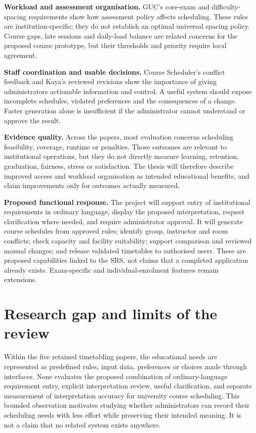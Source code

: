 \documentclass[
  11pt,a4paper,oneside]{report}
\begin{document}
\textbf{Workload and assessment organisation.} GUC's core-exam and difficulty-spacing requirements show how assessment policy affects scheduling. These rules are institution-specific; they do not establish an optimal universal spacing policy. Course gaps, late sessions and daily-load balance are related concerns for the proposed course prototype, but their thresholds and priority require local agreement.

\textbf{Staff coordination and usable decisions.} Course Scheduler's conflict feedback and Kaya's reviewed revisions show the importance of giving administrators actionable information and control. A useful system should expose incomplete schedules, violated preferences and the consequences of a change. Faster generation alone is insufficient if the administrator cannot understand or approve the result.

\textbf{Evidence quality.} Across the papers, most evaluation concerns scheduling feasibility, coverage, runtime or penalties. Those outcomes are relevant to institutional operations, but they do not directly measure learning, retention, graduation, fairness, stress or satisfaction. The thesis will therefore describe improved access and workload organisation as intended educational benefits, and claim improvements only for outcomes actually measured.

\textbf{Proposed functional response.} The project will support entry of institutional requirements in ordinary language, display the proposed interpretation, request clarification where needed, and require administrator approval. It will generate course schedules from approved rules; identify group, instructor and room conflicts; check capacity and facility suitability; support comparison and reviewed manual changes; and release validated timetables to authorised users. These are proposed capabilities linked to the SRS, not claims that a completed application already exists. Exam-specific and individual-enrolment features remain extensions.

\section{Research gap and limits of the review}
Within the five retained timetabling papers, the educational needs are represented as predefined rules, input data, preferences or choices made through interfaces. None evaluates the proposed combination of ordinary-language requirement entry, explicit interpretation review, useful clarification, and separate measurement of interpretation accuracy for university course scheduling. This bounded observation motivates studying whether administrators can record their scheduling needs with less effort while preserving their intended meaning. It is not a claim that no related system exists anywhere.
\end{document}
